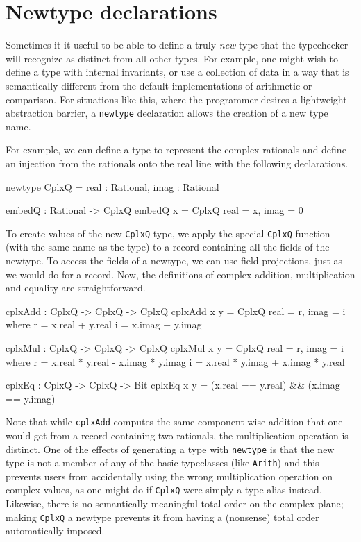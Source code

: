 \section{Newtype declarations}

Sometimes it it useful to be able to define a truly \emph{new} type
that the typechecker will recognize as distinct from all other types.
For example, one might wish to define a type with internal invariants,
or use a collection of data in a way that is semantically different from
the default implementations of arithmetic or comparison.  For
situations like this, where the programmer desires a lightweight
abstraction barrier, a \texttt{newtype} declaration allows the
creation of a new type name.

For example, we can define a type to represent the complex rationals
and define an injection from the rationals onto the real line with the
following declarations.

\begin{code}
  newtype CplxQ = { real : Rational, imag : Rational }

  embedQ : Rational -> CplxQ
  embedQ x = CplxQ { real = x, imag = 0 }
\end{code}

To create values of the new \texttt{CplxQ} type, we apply the special
\texttt{CplxQ} function (with the same name as the type) to a record
containing all the fields of the newtype.  To access the fields of a
newtype, we can use field projections, just as we would do for a
record.  Now, the definitions of complex addition, multiplication and
equality are straightforward.

\begin{code}
  cplxAdd : CplxQ -> CplxQ -> CplxQ
  cplxAdd x y = CplxQ { real = r, imag = i }
    where
      r = x.real + y.real
      i = x.imag + y.imag

  cplxMul : CplxQ -> CplxQ -> CplxQ
  cplxMul x y = CplxQ { real = r, imag = i }
    where
      r = x.real * y.real - x.imag * y.imag
      i = x.real * y.imag + x.imag * y.real

  cplxEq : CplxQ -> CplxQ -> Bit
  cplxEq x y = (x.real == y.real) && (x.imag == y.imag)

\end{code}

Note that while \texttt{cplxAdd} computes the same component-wise
addition that one would get from a record containing two rationals,
the multiplication operation is distinct.  One of the effects of
generating a type with \texttt{newtype} is that the new type is not a
member of any of the basic typeclasses (like \texttt{Arith}) and this
prevents users from accidentally using the wrong multiplication
operation on complex values, as one might do if \texttt{CplxQ} were
simply a type alias instead.  Likewise, there is no semantically
meaningful total order on the complex plane; making \texttt{CplxQ} a
newtype prevents it from having a (nonsense) total order automatically
imposed.

